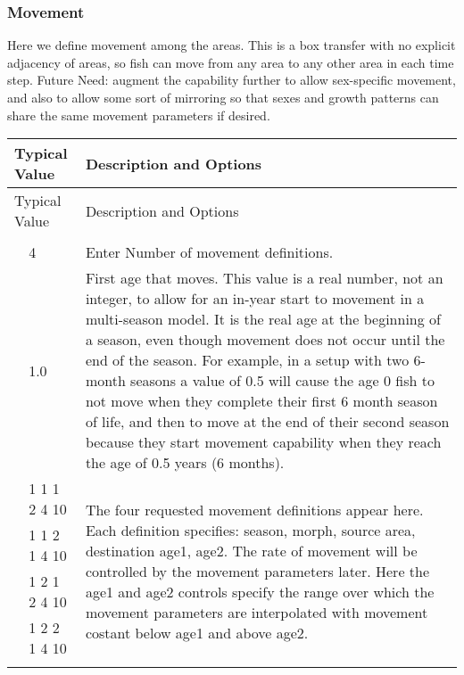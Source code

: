 \subsubsection{Movement}
Here we define movement among the areas.  This is a box transfer with no explicit adjacency of areas, so fish can move from any area to any other area in each time step.  Future Need:  augment the capability further to allow sex-specific movement, and also to allow some sort of mirroring so that sexes and growth patterns can share the same movement parameters if desired.

\begin{longtable}{p{0.5cm} p{2cm} p{12cm}}
	\hline
	\multicolumn{2}{l}{Typical Value} & Description and Options\Tstrut\Bstrut\\
	\hline
	\endfirsthead

	\hline
	\multicolumn{2}{l}{Typical Value} & Description and Options\Tstrut\Bstrut\\
	\hline
	\endhead

	\hline
	\endfoot

	\endlastfoot
	
	\multicolumn{3}{l}{COND:  only if areas > 1}\Tstrut\\ 
	& 4   & Enter Number of movement definitions.\Tstrut\\		
	\Tstrut & 1.0  & First age that moves. This value is a real number, not an integer, to allow for an in-year start to movement in a multi-season model.  It is the real age at the beginning of a season, even though movement does not occur until the end of the season. For example, in a  setup with two 6-month seasons a value of 0.5 will cause the age 0 fish to not move when they complete their first 6 month season of life, and then to move at the end of their second season because they start movement capability when they reach the age of 0.5 years (6 months). \\
	\Tstrut & 1 1 1 2 4 10 & \multicolumn{1}{l}{\multirow{5}{6cm}{\parbox{12cm}{The four requested movement definitions appear here.  Each definition specifies: season, morph, source area, destination age1, age2. The rate of movement will be controlled by the movement parameters later.  Here the age1 and age2 controls specify the range over which the movement parameters are interpolated with movement costant below age1 and above age2.}}}\\
	& 1 1 2 1 4 10 &  \Tstrut\\
	& 1 2 1 2 4 10 &  \\
	& 1 2 2 1 4 10 &  \Bstrut\\
	\\ 
	\hline
	\end{longtable}

